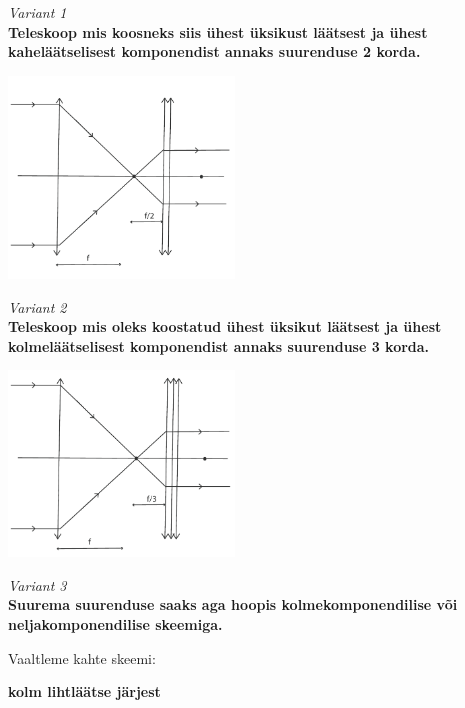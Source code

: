 \documentclass[12pt,a5paper]{article}
\begin{document}
\vspace{20pt}
\emph{Variant 1}\\
\textbf{Teleskoop mis koosneks siis ühest üksikust läätsest ja ühest kaheläätselisest komponendist annaks suurenduse 2 korda.}

\vspace{-10pt}
  \begin{center}
    \includegraphics[width=0.45\textwidth]{laatsed_lah1}
  \end{center}
  \vspace{-10pt}
  


\emph{Variant 2}\\
\textbf{Teleskoop mis oleks koostatud ühest üksikut läätsest ja ühest kolmeläätselisest komponendist annaks suurenduse 3 korda.}

\vspace{-10pt}
  \begin{center}
    \includegraphics[width=0.45\textwidth]{laatsed_lah2}
  \end{center}
  \vspace{-10pt}


\emph{Variant 3}\\
\textbf{Suurema suurenduse saaks aga hoopis kolmekomponendilise  või neljakomponendilise skeemiga.}

Vaaltleme kahte skeemi:

\textbf{kolm lihtläätse järjest}
\end{document}
